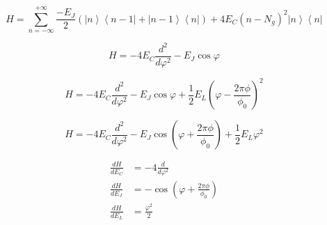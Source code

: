 \documentclass[12pt]{article}
\title{}
\author{John O'Connor}
\date{}
\newcommand{\bra}[1]{\left< #1 \right|}
\newcommand{\ket}[1]{\left| #1 \right>}
\begin{document}
\[ H = \sum_{n=-\infty}^{+\infty} \frac{-E_J}{2}\left( \ket{n}\bra{n-1}
 + \ket{n-1}\bra{n} \right) + 4E_C(n-N_g)^2\ket{n}\bra{n}\]

\[ H = -4E_C\frac{d^2}{d\varphi^2}-E_J\cos{\varphi} \]

\[ H = -4E_C\frac{d^2}{d\varphi^2}-E_J\cos{\varphi}+\frac{1}{2}
E_L\left(\varphi-\frac{2\pi\phi}{\phi_0} \right)^2 \]

\[ H = -4E_C\frac{d^2}{d\varphi^2}-E_J\cos\left(\varphi+
\frac{2\pi\phi}{\phi_0}\right)+
\frac{1}{2} E_L\varphi^2 \]

\begin{align*}
  \frac{dH}{dE_C} &= -4\frac{d}{d\varphi^2}\\
  \frac{dH}{dE_J} &= -\cos(\varphi + \frac{2\pi\phi}{\phi_0}) \\
  \frac{dH}{dE_L} &= \frac{\varphi^2}{2}
\end{align*}
\end{document}
